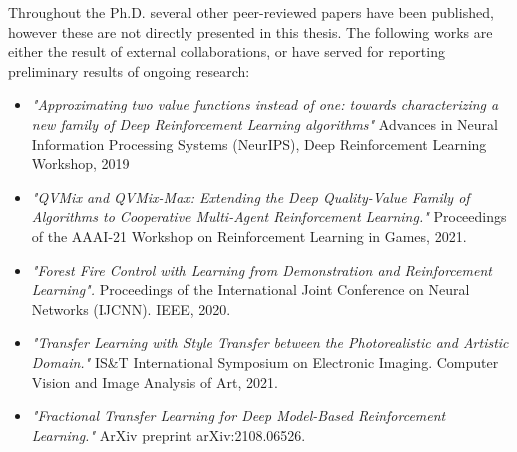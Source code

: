 Throughout the Ph.D. several other peer-reviewed papers have been published, however these are not directly presented in this thesis. The following works are either the result of external collaborations, or have served for reporting preliminary results of ongoing research:

\begin{itemize}
	\item \citet{sabatelli2019approximating}  \textit{"Approximating two value functions instead of one: towards characterizing a new family of Deep Reinforcement Learning algorithms"} Advances in Neural Information Processing Systems (NeurIPS), Deep Reinforcement Learning Workshop, 2019
	\item \citet{leroy21qvmix} \textit{"QVMix and QVMix-Max: Extending the Deep Quality-Value Family of Algorithms to Cooperative Multi-Agent Reinforcement Learning."} Proceedings of the AAAI-21 Workshop on Reinforcement Learning in Games, 2021. 
	\item \citet{hammond2020forest} \textit{"Forest Fire Control with Learning from Demonstration and Reinforcement Learning".} Proceedings of the International Joint Conference on Neural Networks (IJCNN). IEEE, 2020.
	\item \citet{banartransfer} \textit{"Transfer Learning with Style Transfer between the Photorealistic and Artistic Domain."} IS&T International Symposium on Electronic Imaging. Computer Vision and Image Analysis of Art, 2021.
	\item \citet{sasso2021fractional} \textit{"Fractional Transfer Learning for Deep Model-Based Reinforcement Learning."} ArXiv preprint arXiv:2108.06526. 

\end{itemize}
